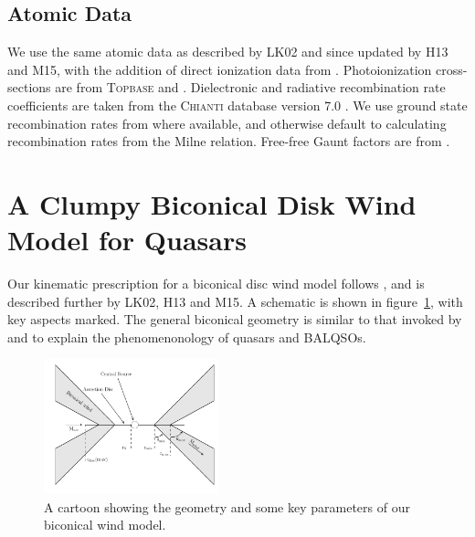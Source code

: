 \documentclass[useAMS,usenatbib]{mn2e_x}
\begin{document}


\subsection{Atomic Data}

We use the same atomic data as described by LK02 and since updated by H13 and M15, 
with the addition of direct ionization data from \cite{dere2007}. 
Photoionization cross-sections are from \textsc{Topbase} \citep{cunto1993} and  \cite{vfky}.
Dielectronic and radiative recombination rate coefficients are taken from 
the \textsc{Chianti} database version 7.0 \citep{dere1997,landi2012}.
We use ground state recombination rates from \cite{badnell2006} where available,
and otherwise default to calculating recombination rates from the Milne
relation. Free-free Gaunt factors are from \cite{sutherland1998}.





%
%

\section{A Clumpy Biconical Disk Wind Model for Quasars}

Our kinematic prescription for a biconical disc wind model
follows \cite{SV93}, and is described further by
LK02, H13 and M15. A schematic is shown in figure~\ref{fig:cartoon},
with key aspects marked. The general biconical
geometry is similar to that invoked by \cite{MCGV95} and 
\cite{elvis2000} to explain the phenomenonology
of quasars and BALQSOs.

\begin{figure} 
\centering
\includegraphics[width=0.45\textwidth]{figures/fig2_cartoon.png}
\caption
{
A cartoon showing the geometry and some key parameters of
our biconical wind model.
}
\label{fig:cartoon}
\end{figure} 
\end{document}
